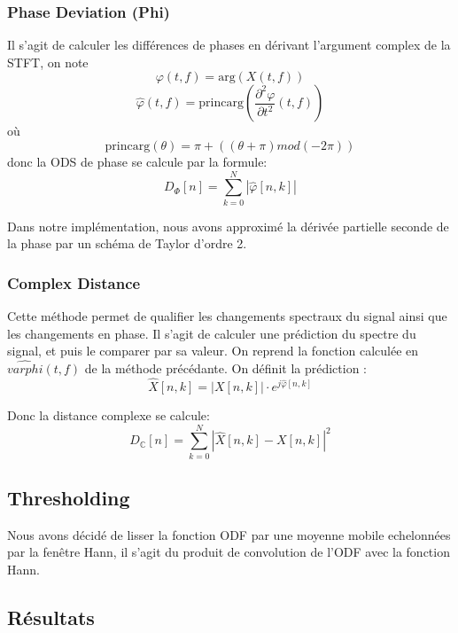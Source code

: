 \documentclass[]{article}
\begin{document}
\hypertarget{phase-deviation-phi}{%
\subsubsection{Phase Deviation (Phi)}\label{phase-deviation-phi}}

Il s'agit de calculer les différences de phases en dérivant l'argument
complex de la STFT, on note \[ \varphi(t, f) = \mathrm{arg}(X(t, f)) \]
\[\hat{\varphi}(t, f) = \mathrm{princarg}
\left( \frac{\partial^2 \varphi}{\partial t^2}(t, f)  \right) \] où
\[ \mathrm{princarg}(\theta) = \pi + ((\theta + \pi) mod (-2\pi)) \]
donc la ODS de phase se calcule par la formule:
\[ D_{\Phi}[n] = \sum\limits_{k=0}^{N}\left\lvert \hat{\varphi}[n, k] \right\rvert \]
\citep{phase}

Dans notre implémentation, nous avons approximé la dérivée partielle
seconde de la phase par un schéma de Taylor d'ordre 2.

\hypertarget{complex-distance}{%
\subsubsection{Complex Distance}\label{complex-distance}}

Cette méthode permet de qualifier les changements spectraux du signal
ainsi que les changements en phase. Il s'agit de calculer une prédiction
du spectre du signal, et puis le comparer par sa valeur. On reprend la
fonction calculée en \(\hat{varphi}(t, f)\) de la méthode précédante. On
définit la prédiction :
\[ \hat{X}[n, k] = \left\lvert X[n, k] \right\rvert \cdot e^{j\hat{\varphi}[n, k]} \]

Donc la distance complexe se calcule:
\[ D_{\mathbb{C}}[n] = \sum\limits_{k=0}^{N} \left\lvert  \hat{X}[n, k] - X[n, k] \right\rvert ^2 \]
\citep{complex}

\hypertarget{thresholding}{%
\subsection{Thresholding}\label{thresholding}}

Nous avons décidé de lisser la fonction ODF par une moyenne mobile
echelonnées par la fenêtre Hann, il s'agit du produit de convolution de
l'ODF avec la fonction Hann.

\hypertarget{resultats}{%
\subsection{Résultats}\label{resultats}}
\end{document}
